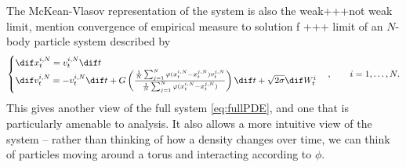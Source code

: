         The McKean-Vlasov representation of the system is also the weak+++not weak limit, mention convergence of empirical measure to solution f +++ limit of an $N$-body particle system described by
        \begin{equation}\label{eq:fullparticle}\begin{cases}
            \dif x^{i,N}_t = v^{i,N}_t\dif t\\
            \dif v^{i,N}_t = -v^{i,N}_t\dif t + G\left(\frac{\frac{1}{N}\sum_{j=1}^N \phi(x_t^{i,N} - x_t^{j,N})v^{j,N}_t  }{\frac{1}{N}\sum_{j=1}^N \phi(x_t^{i,N} - x_t^{j,N})}\right)\dif t + \sqrt{2\sigma} \dif W^i_t 
            \end{cases}, \qquad  i = 1,\dots,N.
        \end{equation}
        This gives another view of the full system \eqref{eq:fullPDE}, and one that is particularly amenable to analysis. It also allows a more intuitive view of the system -- rather than thinking of how a density changes over time, we can think of particles moving around a torus and interacting according to $\phi$.
        
